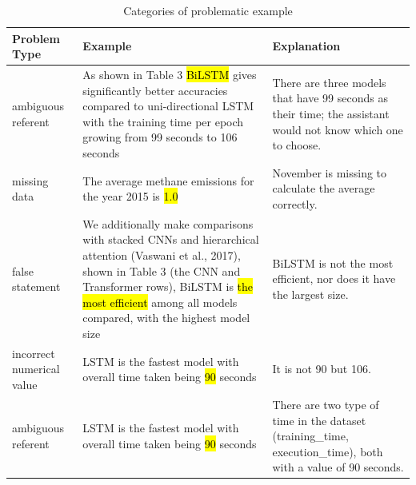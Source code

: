 \begin{table}[t]
    \centering
    \small
    \begin{tabular}{l p{6cm} p{4cm}}
        \hline
        \textbf{Problem Type} & \textbf{Example} & \textbf{Explanation} \\
        \hline

        ambiguous referent &
        As shown in Table 3 \hl{BiLSTM} gives significantly better accuracies compared to uni-directional LSTM with the training time per epoch growing from 99 seconds to 106 seconds &
        There are three models that have 99 seconds as their time; the assistant would not know which one to choose. \\

        missing data &
        The average methane emissions for the year 2015 is \hl{1.0} &
        November is missing to calculate the average correctly. \\

        false statement &
        We additionally make comparisons with stacked CNNs and hierarchical attention (Vaswani et al., 2017), shown in Table 3 (the CNN and Transformer rows), BiLSTM is \hl{the most efficient} among all models compared, with the highest model size &
        BiLSTM is not the most efficient, nor does it have the largest size. \\

        incorrect numerical value &
        LSTM is the fastest model with overall time taken being \hl{90} seconds &
        It is not 90 but 106. \\

        ambiguous referent &
        LSTM is the fastest model with overall time taken being \hl{90} seconds &
        There are two type of time in the dataset (training\_time, execution\_time), both with a value of 90 seconds. \\

        \hline
    \end{tabular}
    \caption{Categories of problematic example}
    \label{tab:ambiguita}
\end{table}





